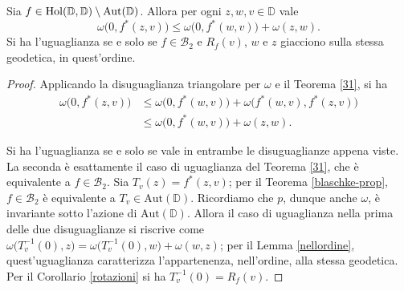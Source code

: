 \begin{cor} \label{32}
  Sia $f \in \text{\normalfont{Hol}}(\mathbb{D},\mathbb{D})\setminus\text{\normalfont{Aut}}(\mathbb{D})$. Allora per ogni $z, w, v \in \mathbb{D}$ vale
  \begin{equation}
    \omega\bigl(0, f^*(z,v)\bigr) \le \omega\bigl(0,f^*(w,v)\bigr)+\omega(z,w).
  \end{equation}
  Si ha l'uguaglianza se e solo se $f \in \mathcal{B}_2$ e $R_f(v)$, $w$ e $z$ giacciono sulla stessa geodetica, in quest'ordine.
\end{cor}

\begin{proof}
  Applicando la disuguaglianza triangolare per $\omega$ e il Teorema \ref{31}, si ha
  \begin{align*}
    \omega\bigl(0,f^*(z,v)\bigr) & \le \omega\bigl(0,f^*(w,v)\bigr)+\omega\bigl(f^*(w,v),f^*(z,v)\bigr) \\
    & \le \omega\bigl(0,f^*(w,v)\bigr)+\omega(z,w).
  \end{align*}

  Si ha l'uguaglianza se e solo se vale in entrambe le disuguaglianze appena viste. La seconda è esattamente il caso di uguaglianza del Teorema \ref{31}, che è equivalente a $f \in \mathcal{B}_2$. Sia $T_v(z)=f^*(z,v)$; per il Teorema \ref{blaschke-prop}, $f \in \mathcal{B}_2$ è equivalente a $T_v \in \text{Aut}(\mathbb{D})$. Ricordiamo che $p$, dunque anche $\omega$, è invariante sotto l'azione di $\text{Aut}(\mathbb{D})$.
  Allora il caso di uguaglianza nella prima delle due disuguaglianze si riscrive come $\omega\bigl(T_v^{-1}(0),z\bigr)=\omega\bigl(T_v^{-1}(0),w\bigr)+\omega(w,z)$; per il Lemma \ref{nellordine}, quest'uguaglianza caratterizza l'appartenenza, nell'ordine, alla stessa geodetica. Per il Corollario \ref{rotazioni} si ha $T_v^{-1}(0)=R_f(v)$.
\end{proof}


